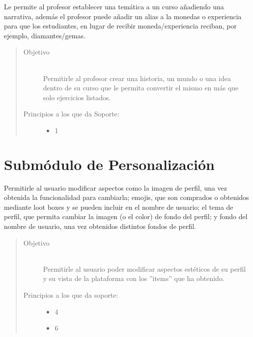     Le permite al profesor establecer una temática a un curso añadiendo una narrativa, además el profesor puede añadir un alias a la monedas o experiencia para que los estudiantes, en lugar de recibir moneda/experiencia reciban, por ejemplo, diamantes/gemas.

    \begin{quote}
    \begin{description}
    \item[Objetivo] \hfill\\
        Permitirle al profesor crear una historia, un mundo o una idea dentro de su curso que le permita convertir el mismo en más que solo ejercicios listados.

    \item[Principios a los que da Soporte:] \hfill
        \begin{itemize}
            \item 1 \principioI{}
        \end{itemize}
    \end{description}
    \end{quote}



\section{Submódulo de Personalización}

    Permitirle al usuario modificar aspectos como la imagen de perfil, una vez obtenida la funcionalidad para cambiarla; emojis, que son comprados o obtenidos mediante loot boxes y se pueden incluir en el nombre de usuario; el tema de perfil, que permita cambiar la imagen (o el color) de fondo del perfil; y fondo del nombre de usuario, una vez obtenidos distintos fondos de perfil.


    \begin{quote}
    \begin{description}
    \item[Objetivo] \hfill\\
        Permitirle al usuario poder modificar aspectos estéticos de su perfil y su vista de la plataforma con los ''items'' que ha obtenido.

    \item[Principios a los que da soporte:] \hfill
        \begin{itemize}
            \item 4 \principioIV
            \item 6 \principioVI
        \end{itemize}
    \end{description}
    \end{quote}

\clearpage
